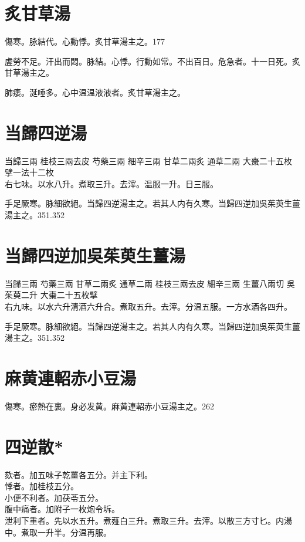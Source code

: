 \section{炙甘草湯}

傷寒。脉結代。心動悸。炙甘草湯主之。177

虗勞不足。汗出而悶。脉結。心悸。行動如常。不出百日。危急者。十一日死。炙甘草湯主之。

肺痿。涎唾多。心中温温液液者。炙甘草湯主之。

\section{当歸四逆湯}

当歸{\scriptsize 三兩} 桂枝{\scriptsize 三兩去皮} 芍藥{\scriptsize 三兩} 細辛{\scriptsize 三兩} 甘草{\scriptsize 二兩炙} 通草{\scriptsize 二兩} 大棗{\scriptsize 二十五枚擘一法十二枚}\\
右七味。以水八升。煮取三升。去滓。温服一升。日三服。

手足厥寒。脉細欲絕。当歸四逆湯主之。若其人内有久寒。当歸四逆加吳茱萸生薑湯主之。351.352

\section{当歸四逆加吳茱萸生薑湯}

当歸{\scriptsize 三兩} 芍藥{\scriptsize 三兩} 甘草{\scriptsize 二兩炙} 通草{\scriptsize 二兩} 桂枝{\scriptsize 三兩去皮} 細辛{\scriptsize 三兩} 生薑{\scriptsize 八兩切} 吳茱萸{\scriptsize 二升} 大棗{\scriptsize 二十五枚擘}\\
右九味。以水六升清酒六升合。煮取五升。去滓。分温五服。{\scriptsize 一方水酒各四升。}

手足厥寒。脉細欲絕。当歸四逆湯主之。若其人内有久寒。当歸四逆加吳茱萸生薑湯主之。351.352

\section{麻黄連軺赤小豆湯}

傷寒。瘀熱在裏。身必发黄。麻黄連軺赤小豆湯主之。262

\section{四逆散*}

欬者。加五味子乾薑各五分。并主下利。\\
悸者。加桂枝五分。\\
小便不利者。加茯苓五分。\\
腹中痛者。加附子一枚炮令坼。\\
泄利下重者。先以水五升。煮薤白三升。煮取三升。去滓。以散三方寸匕。内湯中。煮取一升半。分温再服。

